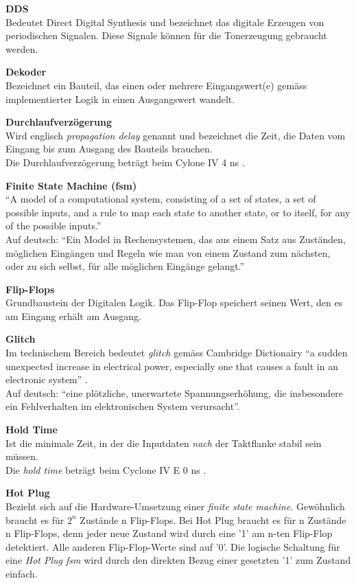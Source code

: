 \textbf{DDS}\\
Bedeutet Direct Digital Synthesis und bezeichnet das digitale Erzeugen von periodischen Signalen. Diese Signale können für die Tonerzeugung gebraucht werden.

\textbf{Dekoder}\\
Bezeichnet ein Bauteil, das einen oder mehrere Eingangswert(e) gemäss implementierter Logik in einen Ausgangswert wandelt.

\textbf{Durchlaufverzögerung}\\
Wird englisch \textit{propagation delay} genannt und bezeichnet die Zeit, die Daten vom Eingang bis zum Ausgang des Bauteils brauchen.\\
Die Durchlaufverzögerung beträgt beim Cylone IV 4 ns \citep{Handbook_Altera}.

\textbf{Finite State Machine (fsm)}\\
``A model of a computational system, consisting of a set of states, a set of possible inputs, and a rule to map each state to another state, or to itself, for any of the possible inputs.'' \citep{fsm}\\
Auf deutsch: ``Ein Model in Rechensystemen, das aus einem Satz aus Zuständen, möglichen Eingängen und Regeln wie man von einem Zustand zum nächsten, oder zu sich selbst, für alle möglichen Eingänge gelangt.''

\textbf{Flip-Flops}\\
Grundbaustein der Digitalen Logik. Das Flip-Flop speichert seinen Wert, den es am Eingang erhält am Ausgang.

\textbf{Glitch}\\
Im technischem Bereich bedeutet \textit{glitch} gemäss Cambridge Dictionairy ``a sudden unexpected increase in electrical power, especially one that causes a fault in an electronic system'' \citep{dictionair}.\\
Auf deutsch: ``eine plötzliche, unerwartete Spannungserhöhung, die insbesondere ein Fehlverhalten im elektronischen System verursacht''.

\textbf{Hold Time}\\
Ist die minimale Zeit, in der die Inputdaten \textit{nach} der Taktflanke stabil sein müssen.\\
Die \textit{hold time} beträgt beim  Cyclone IV E 0 ns \citep{Handbook_Altera}.

\textbf{Hot Plug}\\
Bezieht sich auf die Hardware-Umsetzung einer \textit{finite state machine}. Gewöhnlich braucht es für \begin{math} 2^n \end{math} Zustände n Flip-Flops. Bei Hot Plug braucht es für n Zustände n Flip-Flops, denn jeder neue Zustand wird durch eine '1' am n-ten Flip-Flop detektiert. Alle anderen Flip-Flop-Werte sind auf '0'. Die logische Schaltung für eine \textit{Hot Plug fsm} wird durch den direkten Bezug einer gesetzten '1' zum Zustand einfach.


